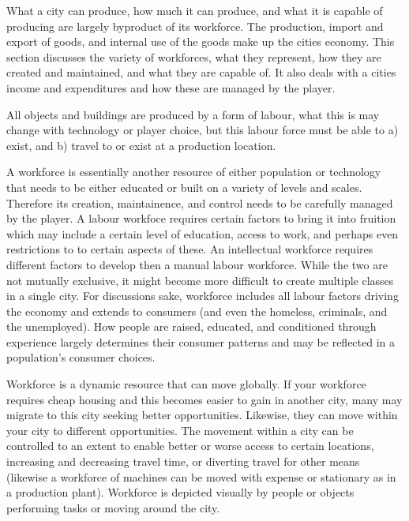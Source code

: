 
What a city can produce, how much it can produce, and what it is capable of producing are largely byproduct of its workforce. The production, import and export of goods, and internal use of the goods make up the cities economy. This section discusses the variety of workforces, what they represent, how they are created and maintained, and what they are capable of. It also deals with a cities income and expenditures and how these are managed by the player.  

All objects and buildings are produced by a form of labour, what this is may change with technology or player choice, but this labour force must be able to a) exist, and b) travel to or exist at a production location.

A workforce is essentially another resource of either population or technology that needs to be either educated or built on a variety of levels and scales. Therefore its creation, maintainence, and control needs to be carefully managed by the player. A labour workfoce requires certain factors to bring it into fruition which may include a certain level of education, access to work, and perhaps even restrictions to to certain aspects of these. An intellectual workforce requires different factors to develop then a manual labour workforce. While the two are not mutually exclusive, it might become more difficult to create multiple classes in a single city. For discussions sake, workforce includes all labour factors driving the economy and extends to consumers (and even the homeless, criminals, and the unemployed). How people are raised, educated, and conditioned through experience largely determines their consumer patterns and may be reflected in a population's consumer choices.

Workforce is a dynamic resource that can move globally. If your workforce requires cheap housing and this becomes easier to gain in another city, many may migrate to this city seeking better opportunities. Likewise, they can move within your city to different opportunities. The movement within a city can be controlled to an extent to enable better or worse access to certain locations, increasing and decreasing travel time, or diverting travel for other means (likewise a workforce of machines can be moved with expense or stationary as in a production plant). Workforce is depicted visually by people or objects performing tasks or moving around the city. 

